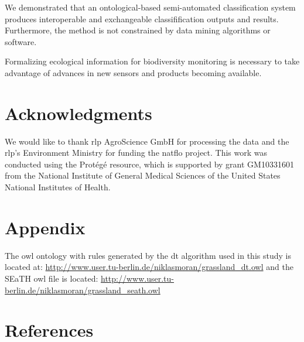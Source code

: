 \documentclass[authoryear,preprint,12pt,number]{elsarticle}
\begin{document}
We demonstrated that an ontological-based semi-automated classification system
produces interoperable and exchangeable classifification outputs
and results. Furthermore, the method is not constrained by data mining
algorithms or software.  

Formalizing ecological information for biodiversity monitoring is
necessary to take advantage of advances in new sensors and products becoming
available. 
\section{Acknowledgments}
We would like to thank \gls{rlp} AgroScience GmbH for processing the data and 
the \gls{rlp}'s Environment Ministry for funding the \gls{natflo} project. This 
work was conducted using the Prot\'eg\'e resource, which is supported by grant 
GM10331601 from the National Institute of General Medical Sciences of the 
United States National Institutes of Health.
\section{Appendix}
The \gls{owl} ontology with rules generated by the \gls{dt} algorithm used in 
this study is
located at: \url{http://www.user.tu-berlin.de/niklasmoran/grassland_dt.owl} and
the SEaTH \gls{owl} file is located:
\url{http://www.user.tu-berlin.de/niklasmoran/grassland_seath.owl}

\section{References}

\end{document}
